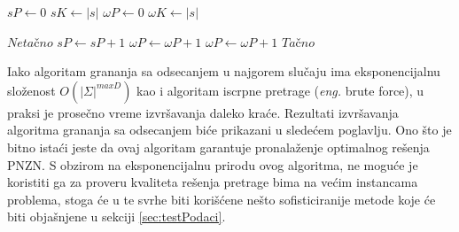 \documentclass[12pt,oneside]{memoir}
\begin{document}
  \begin{algorithm}
    \caption{$\textbf{Podniska}\bm{(s,\omega)}$}
    \label{alg:podNiska}
    \begin{algorithmic}[1]
    \State $sP \gets 0$ 
    \State $sK \gets |s|$ 
    \State $\omega P \gets 0$ 
    \State $\omega K \gets |s|$ 

    \State
        \State \Return $Neta\textrm{č}no$
        \State $sP \gets sP + 1$
        \State $\omega P \gets \omega P + 1$
      \Else
        \State $\omega P \gets \omega P + 1$
      \EndIf
    \EndWhile
    \State
    \State \Return $Ta\textrm{č}no$
    \end{algorithmic}
    \end{algorithm}
Iako algoritam grananja sa odsecanjem u najgorem slučaju ima eksponencijalnu složenost $O(|\Sigma|^{maxD})$
kao i algoritam iscrpne pretrage (\textit{eng.} brute force), u praksi je prosečno vreme izvršavanja
daleko kraće. Rezultati izvršavanja algoritma grananja sa odsecanjem biće prikazani u sledećem poglavlju.
Ono što je bitno istaći jeste da ovaj algoritam garantuje pronalaženje optimalnog rešenja PNZN.
S obzirom na eksponencijalnu prirodu ovog algoritma, ne moguće je koristiti ga
za proveru kvaliteta rešenja pretrage bima na većim instancama problema, stoga će u te svrhe biti korišćene
nešto sofisticiranije metode koje će biti objašnjene u sekciji \ref{sec:testPodaci}.

\end{document}
